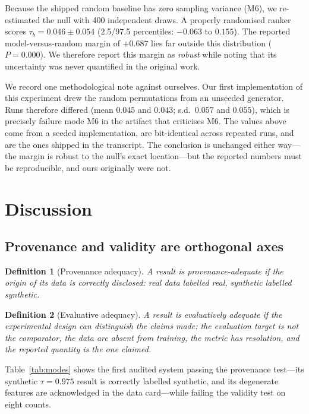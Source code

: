 \documentclass[conference]{IEEEtran}
\newtheorem{definition}{Definition}
\begin{document}
\label{sec:randomnull}

Because the shipped random baseline has zero sampling variance (M6), we re-estimated the
null with 400 independent draws. A properly randomised ranker scores
$\tau_b = 0.046 \pm 0.054$ (2.5/97.5 percentiles: $-0.063$ to $0.155$). The reported
model-versus-random margin of $+0.687$ lies far outside this distribution
($P=0.000$). We therefore report this margin as \emph{robust} while noting that its
uncertainty was never quantified in the original work.

We record one methodological note against ourselves. Our first implementation of this
experiment drew the random permutations from an unseeded generator. Runs therefore differed
(mean $0.045$ and $0.043$; s.d.\ $0.057$ and $0.055$), which is precisely failure mode M6 in
the artifact that criticises M6. The values above come from a seeded implementation, are
bit-identical across repeated runs, and are the ones shipped in the transcript. The
conclusion is unchanged either way---the margin is robust to the null's exact location---but
the reported numbers must be reproducible, and ours originally were not.

\section{Discussion}

\label{sec:discussion}

\subsection{Provenance and validity are orthogonal axes}

\begin{definition}[Provenance adequacy]
A result is \emph{provenance-adequate} if the origin of its data is correctly disclosed:
real data labelled real, synthetic labelled synthetic.
\end{definition}

\begin{definition}[Evaluative adequacy]
A result is \emph{evaluatively adequate} if the experimental design can distinguish the
claims made: the evaluation target is not the comparator, the data are absent from
training, the metric has resolution, and the reported quantity is the one claimed.
\end{definition}

Table~\ref{tab:modes} shows the first audited system passing the provenance test---its
synthetic $\tau=0.975$ result is correctly labelled synthetic, and its degenerate features
are acknowledged in the data card---while failing the validity test on eight counts.
\end{document}
